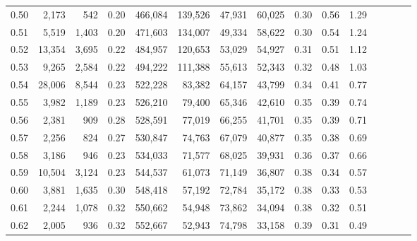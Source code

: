 \begin{tabular}{rrrcrrrrrrrrrrr}
0.50 &   2,173 &    542 &                                       0.20 &  466,084 &  139,526 &   47,931 &   60,025 &  0.30 &  0.56 &                         1.29 \\
0.51 &   5,519 &  1,403 &                                       0.20 &  471,603 &  134,007 &   49,334 &   58,622 &  0.30 &  0.54 &                         1.24 \\
0.52 &  13,354 &  3,695 &                                       0.22 &  484,957 &  120,653 &   53,029 &   54,927 &  0.31 &  0.51 &                         1.12 \\
0.53 &   9,265 &  2,584 &                                       0.22 &  494,222 &  111,388 &   55,613 &   52,343 &  0.32 &  0.48 &                         1.03 \\
0.54 &  28,006 &  8,544 &                                       0.23 &  522,228 &   83,382 &   64,157 &   43,799 &  0.34 &  0.41 &                         0.77 \\
0.55 &   3,982 &  1,189 &                                       0.23 &  526,210 &   79,400 &   65,346 &   42,610 &  0.35 &  0.39 &                         0.74 \\
0.56 &   2,381 &    909 &                                       0.28 &  528,591 &   77,019 &   66,255 &   41,701 &  0.35 &  0.39 &                         0.71 \\
0.57 &   2,256 &    824 &                                       0.27 &  530,847 &   74,763 &   67,079 &   40,877 &  0.35 &  0.38 &                         0.69 \\
0.58 &   3,186 &    946 &                                       0.23 &  534,033 &   71,577 &   68,025 &   39,931 &  0.36 &  0.37 &                         0.66 \\
0.59 &  10,504 &  3,124 &                                       0.23 &  544,537 &   61,073 &   71,149 &   36,807 &  0.38 &  0.34 &                         0.57 \\
0.60 &   3,881 &  1,635 &                                       0.30 &  548,418 &   57,192 &   72,784 &   35,172 &  0.38 &  0.33 &                         0.53 \\
0.61 &   2,244 &  1,078 &                                       0.32 &  550,662 &   54,948 &   73,862 &   34,094 &  0.38 &  0.32 &                         0.51 \\
0.62 &   2,005 &    936 &                                       0.32 &  552,667 &   52,943 &   74,798 &   33,158 &  0.39 &  0.31 &                         0.49 \\

\end{tabular}

